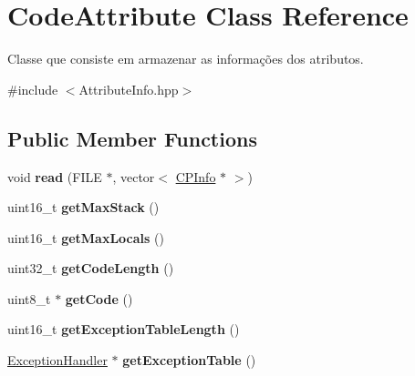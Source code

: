 \hypertarget{classCodeAttribute}{}\section{Code\+Attribute Class Reference}
\label{classCodeAttribute}


Classe que consiste em armazenar as informações dos atributos.  




{\ttfamily \#include $<$Attribute\+Info.\+hpp$>$}

\subsection*{Public Member Functions}
\begin{DoxyCompactItemize}
\item 
void {\bfseries read} (F\+I\+LE $\ast$, vector$<$ \hyperlink{classCPInfo}{C\+P\+Info} $\ast$ $>$)\hypertarget{classCodeAttribute_acb8378aad8421371b26442ffbf778de4}{}\label{classCodeAttribute_acb8378aad8421371b26442ffbf778de4}

\item 
uint16\+\_\+t {\bfseries get\+Max\+Stack} ()\hypertarget{classCodeAttribute_a9eb6a6b7bd7bd870f745bc089d407e45}{}\label{classCodeAttribute_a9eb6a6b7bd7bd870f745bc089d407e45}

\item 
uint16\+\_\+t {\bfseries get\+Max\+Locals} ()\hypertarget{classCodeAttribute_aa97ceb04d99e607389a4cf08b3b65db1}{}\label{classCodeAttribute_aa97ceb04d99e607389a4cf08b3b65db1}

\item 
uint32\+\_\+t {\bfseries get\+Code\+Length} ()\hypertarget{classCodeAttribute_ae365ff1b5fc98df49f3f61379d59978f}{}\label{classCodeAttribute_ae365ff1b5fc98df49f3f61379d59978f}

\item 
uint8\+\_\+t $\ast$ {\bfseries get\+Code} ()\hypertarget{classCodeAttribute_a713d99a501cb88c344013b5820ea6e8b}{}\label{classCodeAttribute_a713d99a501cb88c344013b5820ea6e8b}

\item 
uint16\+\_\+t {\bfseries get\+Exception\+Table\+Length} ()\hypertarget{classCodeAttribute_a4a1408612b357305d2c27673d8e18124}{}\label{classCodeAttribute_a4a1408612b357305d2c27673d8e18124}

\item 
\hyperlink{classExceptionHandler}{Exception\+Handler} $\ast$ {\bfseries get\+Exception\+Table} ()\hypertarget{classCodeAttribute_a7905efeeb4bbdd57cc07605757372db5}{}\label{classCodeAttribute_a7905efeeb4bbdd57cc07605757372db5}


\end{DoxyCompactItemize}
